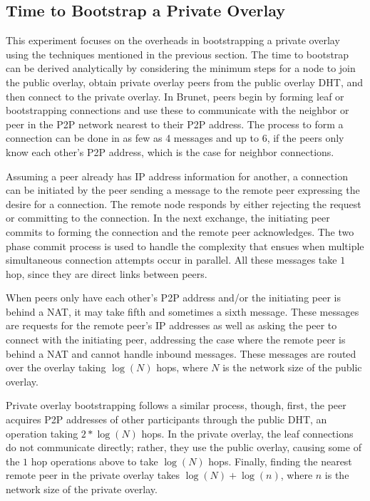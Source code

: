 \subsection{Time to Bootstrap a Private Overlay}

This experiment focuses on the overheads in bootstrapping a private overlay
using the techniques mentioned in the previous section.  The time to bootstrap
can be derived analytically by considering the minimum steps for a node to join
the public overlay, obtain private overlay peers from the public overlay DHT,
and then connect to the private overlay.  In Brunet, peers begin by forming
leaf or bootstrapping connections and use these to communicate with the
neighbor or peer in the P2P network nearest to their P2P address.  The process
to form a connection can be done in as few as 4 messages and up to 6, if the
peers only know each other's P2P address, which is the case for neighbor
connections.

Assuming a peer already has IP address information for another, a connection
can be initiated by the peer sending a message to the remote peer expressing
the desire for a connection.  The remote node responds by either rejecting the
request or committing to the connection.  In the next exchange, the initiating
peer commits to forming the connection and the remote peer acknowledges.  The
two phase commit process is used to handle the complexity that ensues when
multiple simultaneous connection attempts occur in parallel.  All these
messages take $1$ hop, since they are direct links between peers.

When peers only have each other's P2P address and/or the initiating peer is
behind a NAT, it may take fifth and sometimes a sixth message.  These messages
are requests for the remote peer's IP addresses as well as asking the peer to
connect with the initiating peer, addressing the case where the remote peer is
behind a NAT and cannot handle inbound messages.  These messages are routed
over the overlay taking $\log(N)$ hops, where $N$ is the network size of the
public overlay.

Private overlay bootstrapping follows a similar process, though, first, the
peer acquires P2P addresses of other participants through the public DHT, an
operation taking $2 *\log(N)$ hops.  In the private overlay, the leaf
connections do not communicate directly; rather, they use the public overlay,
causing some of the $1$ hop operations above to take $\log(N)$ hops.  Finally,
finding the nearest remote peer in the private overlay takes $\log(N) +
\log(n)$, where $n$ is the network size of the private overlay.

